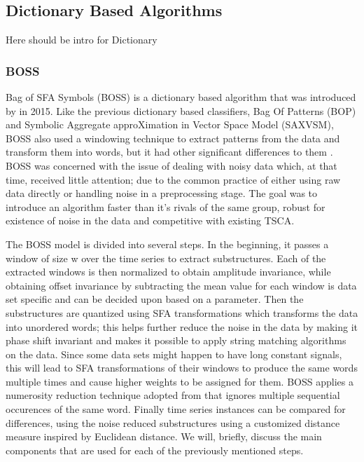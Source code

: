\subsection{Dictionary Based Algorithms}
\label{SubsectionDictionary}
Here should be intro for Dictionary

\subsubsection{BOSS}
\label{SubsubsectionBOSS}
Bag of SFA Symbols (BOSS) is a dictionary based algorithm that was introduced by \cite{schafer2015boss} in 2015.
Like the previous dictionary based classifiers, Bag Of Patterns (BOP) and Symbolic Aggregate approXimation in Vector Space Model (SAXVSM),
BOSS also used a windowing technique to extract patterns from the data and transform them into words, but it had other significant differences to them \cite{bagnall2017great}.
BOSS was concerned with the issue of dealing with noisy data which, at that time, received little attention; due to the common practice of
either using raw data directly or handling noise in a preprocessing stage. The goal was to introduce an algorithm faster than it's rivals of the same group,
robust for existence of noise in the data and competitive with existing TSCA.

The BOSS model is divided into several steps. In the beginning, it passes a window of size w over the time series to extract substructures.
Each of the extracted windows is then normalized to obtain amplitude invariance, while obtaining offset invariance by subtracting the mean value
for each window is data set specific and can be decided upon based on a parameter.
Then the substructures are quantized using SFA transformations which transforms the data into unordered words;
this helps further reduce the noise in the data by making it phase shift invariant and makes it possible to apply string matching algorithms on the data.
Since some data sets might happen to have long constant signals, this will lead to SFA transformations of their windows to produce the same words multiple times
and cause higher weights to be assigned for them. BOSS applies a numerosity reduction technique adopted from \cite{lin2007experiencing,lin2012rotation}
that ignores multiple sequential occurences of the same word.
Finally time series instances can be compared for differences, using the noise reduced substructures using a customized distance measure inspired by Euclidean distance.
We will, briefly, discuss the main components that are used for each of the previously mentioned steps.

